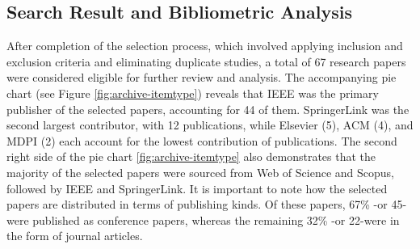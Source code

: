 \subsection{Search Result and Bibliometric Analysis}

After completion of the selection process, which involved applying inclusion and exclusion criteria and eliminating duplicate studies, a total of 67 research papers were considered eligible for further review and analysis. The accompanying pie chart (see Figure \ref{fig:archive-itemtype}) reveals that IEEE was the primary publisher of the selected papers, accounting for 44 of them. SpringerLink was the second largest contributor, with 12 publications, while Elsevier (5), ACM (4), and MDPI (2) each account for the lowest contribution of publications. The second right side of the pie chart \ref{fig:archive-itemtype} also demonstrates that the majority of the selected papers were sourced from Web of Science and Scopus, followed by IEEE and SpringerLink. It is important to note how the selected papers are distributed in terms of publishing kinds. Of these papers, 67\% -or 45-were published as conference papers, whereas the remaining 32\% -or 22-were in the form of journal articles.







